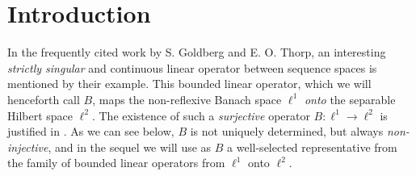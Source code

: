 \documentclass[12pt,twoside,reqno]{amsart}
\theoremstyle{definition}
\numberwithin{equation}{section}
\begin{document}
\renewcommand{\thefootnote}{}


\bigskip
	
\section{Introduction} \label{sec:introduction}

In the frequently cited work \cite{GoldThorp63} by S. Goldberg and E. O. Thorp, an interesting \emph{strictly singular} and continuous linear operator between sequence spaces is mentioned by their example.
This bounded linear operator, which we will henceforth call $B$,  maps the non-reflexive Banach space $\ell^1$ \emph{onto} the separable Hilbert space $\ell^2$.
The existence of such a \emph{surjective} operator $B: \ell^1 \to \ell^2$ is justified in \cite{Mazur33}. As we can see below, $B$ is not uniquely determined, but always \emph{non-injective},  and in the sequel we will use as $B$ a well-selected representative from the family of bounded linear operators from $\ell^1$ onto $\ell^2$.
\end{document}
